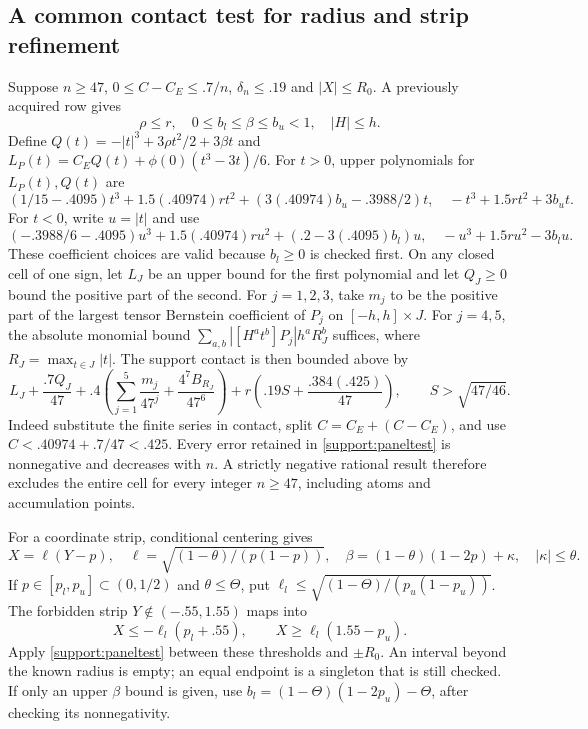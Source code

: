 \subsection{A common contact test for radius and strip refinement}
\label{support:panels}
Suppose $n\ge47$, $0\le C-C_E\le.7/n$, $\delta_n\le.19$ and
$|X|\le R_0$. A previously acquired row gives
\[
 \rho\le r,\quad 0\le b_l\le\beta\le b_u<1,\quad |H|\le h.
\]
Define $Q(t)=-|t|^3+3\rho t^2/2+3\beta t$ and
$L_P(t)=C_EQ(t)+\phi(0)(t^3-3t)/6$.
For $t>0$, upper polynomials for $L_P(t),Q(t)$ are
\[
 (1/15-.4095)t^3+1.5(.40974)rt^2+(3(.40974)b_u-.3988/2)t,
 \quad -t^3+1.5rt^2+3b_ut.
\]
For $t<0$, write $u=|t|$ and use
\[
 (-.3988/6-.4095)u^3+1.5(.40974)ru^2+(.2-3(.4095)b_l)u,
 \quad -u^3+1.5ru^2-3b_lu.
\]
These coefficient choices are valid because $b_l\ge0$ is checked first.
On any closed cell of one sign, let $L_J$ be an upper bound for the
first polynomial and let $Q_J\ge0$ bound the positive part of the second.
For $j=1,2,3$, take $m_j$ to be the positive part of the largest tensor
Bernstein coefficient of $P_j$ on $[-h,h]\times J$. For $j=4,5$, the
absolute monomial bound
$\sum_{a,b}|[H^at^b]P_j|h^aR_J^b$ suffices, where
$R_J=\max_{t\in J}|t|$. The support contact is then bounded above by
\begin{equation}\label{support:paneltest}
 L_J+\frac{.7Q_J}{47}
 +.4\left(\sum_{j=1}^5\frac{m_j}{47^j}
                +\frac{4^7B_{R_J}}{47^6}\right)
 +r\left(.19S+\frac{.384(.425)}{47}\right),
 \qquad S>\sqrt{47/46}.
\end{equation}
Indeed substitute the finite series in contact, split $C=C_E+(C-C_E)$,
and use $C<.40974+.7/47<.425$. Every error retained in
\eqref{support:paneltest} is nonnegative and decreases with $n$.
A strictly negative rational result therefore excludes the entire cell
for every integer $n\ge47$, including atoms and accumulation points.

For a coordinate strip, conditional centering gives
\[
 X=\ell(Y-p),\quad
 \ell=\sqrt{(1-\theta)/(p(1-p))},\quad
 \beta=(1-\theta)(1-2p)+\kappa,\quad |\kappa|\le\theta.
\]
If $p\in[p_l,p_u]\subset(0,1/2)$ and $\theta\le\Theta$, put
$\ell_l\le\sqrt{(1-\Theta)/(p_u(1-p_u))}$.
The forbidden strip $Y\notin(-.55,1.55)$ maps into
\[
 X\le-\ell_l(p_l+.55),\qquad X\ge\ell_l(1.55-p_u).
\]
Apply \eqref{support:paneltest} between these thresholds and $\pm R_0$.
An interval beyond the known radius is empty; an equal endpoint is a
singleton that is still checked. If only an upper $\beta$ bound is given,
use $b_l=(1-\Theta)(1-2p_u)-\Theta$, after checking its nonnegativity.

